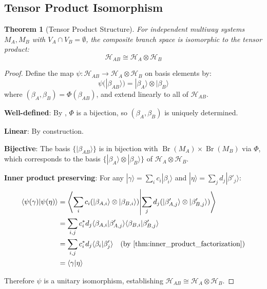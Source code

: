 \documentclass[11pt,a4paper]{article}
\newtheorem{theorem}{Theorem}[section]
\theoremstyle{definition}
\theoremstyle{remark}
\DeclareMathOperator{\Br}{Br}
\newcommand{\Hilb}{\mathcal{H}}
\newcommand{\ket}[1]{|#1\rangle}
\newcommand{\braket}[2]{\langle#1|#2\rangle}
\begin{document}
\subsection{Tensor Product Isomorphism}

\begin{theorem}[Tensor Product Structure]
\label{thm:tensor_product}
For independent multiway systems $M_A, M_B$ with $V_A \cap V_B = \emptyset$, the composite branch space is isomorphic to the tensor product:
\begin{equation}
\Hilb_{AB} \cong \Hilb_A \otimes \Hilb_B
\end{equation}
\end{theorem}

\begin{proof}
Define the map $\psi: \Hilb_{AB} \to \Hilb_A \otimes \Hilb_B$ on basis elements by:
\begin{equation}
\psi(\ket{\beta_{AB}}) = \ket{\beta_A} \otimes \ket{\beta_B}
\end{equation}
where $(\beta_A, \beta_B) = \Phi(\beta_{AB})$, and extend linearly to all of $\Hilb_{AB}$.

\textbf{Well-defined}: By , $\Phi$ is a bijection, so $(\beta_A, \beta_B)$ is uniquely determined.

\textbf{Linear}: By construction.

\textbf{Bijective}: The basis $\{\ket{\beta_{AB}}\}$ is in bijection with $\Br(M_A) \times \Br(M_B)$ via $\Phi$, which corresponds to the basis $\{\ket{\beta_A} \otimes \ket{\beta_B}\}$ of $\Hilb_A \otimes \Hilb_B$.

\textbf{Inner product preserving}: For any $\ket{\gamma} = \sum_i c_i \ket{\beta_i}$ and $\ket{\eta} = \sum_j d_j \ket{\beta'_j}$:
\begin{align}
\braket{\psi(\gamma)}{\psi(\eta)} &= \left\langle \sum_i c_i (\ket{\beta_{A,i}} \otimes \ket{\beta_{B,i}}) \middle| \sum_j d_j (\ket{\beta'_{A,j}} \otimes \ket{\beta'_{B,j}}) \right\rangle \\
&= \sum_{i,j} c_i^* d_j \braket{\beta_{A,i}}{\beta'_{A,j}} \braket{\beta_{B,i}}{\beta'_{B,j}} \\
&= \sum_{i,j} c_i^* d_j \braket{\beta_i}{\beta'_j} \quad \text{(by \Cref{thm:inner_product_factorization})} \\
&= \braket{\gamma}{\eta}
\end{align}

Therefore $\psi$ is a unitary isomorphism, establishing $\Hilb_{AB} \cong \Hilb_A \otimes \Hilb_B$.
\end{proof}
\end{document}

